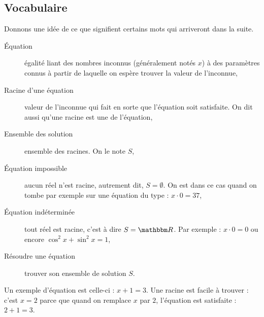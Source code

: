\subsection{Vocabulaire}

Donnons une idée de ce que signifient certains mots qui arriveront dans la suite.
\begin{description}
\item[Équation] égalité liant des nombres inconnus (généralement notés $x$) à des paramètres connus à partir de laquelle on espère trouver la valeur de l'inconnue,
\item[Racine d'une équation] valeur de l'inconnue qui fait en sorte que l'équation soit satisfaite. On dit aussi qu'une racine est une  de l'équation,
\item[Ensemble des solution] ensemble des racines. On le note $S$,
\item[Équation impossible] aucun réel n'est racine, autrement dit, $S=\emptyset$. On est dans ce cas quand on tombe par exemple sur une équation du type : $x\cdot 0=37$,
\item[Équation indéterminée] tout réel est racine, c'est à dire $S=\eR$. Par exemple : $x\cdot 0=0$ ou encore $\cos^{2} x+\sin^{2}x=1$,
\item[Résoudre une équation] trouver son ensemble de solution $S$.
\end{description}

Un exemple d'équation est celle-ci : $x+1=3$. Une racine est facile à trouver : c'est $x=2$ parce que quand on remplace $x$ par $2$, l'équation est satisfaite : $2+1=3$.

